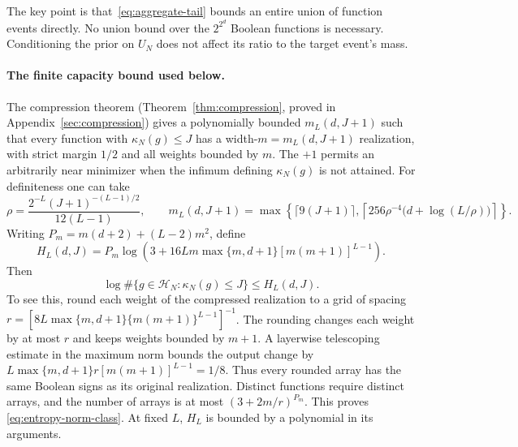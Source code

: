 The key point is that~\eqref{eq:aggregate-tail} bounds an entire union of
function events directly. No union bound over the $2^{2^d}$ Boolean functions
is necessary. Conditioning the prior on $U_N$ does not affect its ratio to
the target event's mass.

\paragraph{The finite capacity bound used below.}
The compression theorem (Theorem~\ref{thm:compression}, proved in
Appendix~\ref{sec:compression}) gives a polynomially
bounded $m_L(d,J+1)$ such that every function with $\kappa_N(g)\leq J$ has
a width-$m=m_L(d,J+1)$ realization, with strict margin $1/2$ and all weights
bounded by $m$. The $+1$ permits an arbitrarily near minimizer when the
infimum defining $\kappa_N(g)$ is not attained. For definiteness one can take
\[
 \rho=\frac{2^{-L}(J+1)^{-(L-1)/2}}{12(L-1)},\qquad
 m_L(d,J+1)=\max\left\{\lceil9(J+1)\rceil,
 \left\lceil256\rho^{-4}\bigl(d+\log(L/\rho)\bigr)\right\rceil\right\}.
\]
Writing $P_m=m(d+2)+(L-2)m^2$, define
\begin{equation}\label{eq:finite-capacity-bound}
 H_L(d,J)=P_m\log\left(
 3+16Lm\max\{m,d+1\}[m(m+1)]^{L-1}\right).
\end{equation}
Then
\begin{equation}\label{eq:entropy-norm-class}
 \log\#\{g\in\mathcal H_N:\kappa_N(g)\leq J\}
 \leq H_L(d,J).
\end{equation}
To see this, round each weight of the compressed realization to a grid of
spacing
$r=[8L\max\{m,d+1\}\{m(m+1)\}^{L-1}]^{-1}$.
The rounding changes each weight by at most $r$ and keeps weights bounded
by $m+1$. A layerwise telescoping estimate in the maximum norm bounds the
output change by
$L\max\{m,d+1\}r[m(m+1)]^{L-1}=1/8$.
Thus every rounded array has the same Boolean signs as its original
realization. Distinct functions require distinct arrays, and the number of
arrays is at most $(3+2m/r)^{P_m}$. This proves
\eqref{eq:entropy-norm-class}. At fixed $L$, $H_L$ is bounded by a
polynomial in its arguments.


